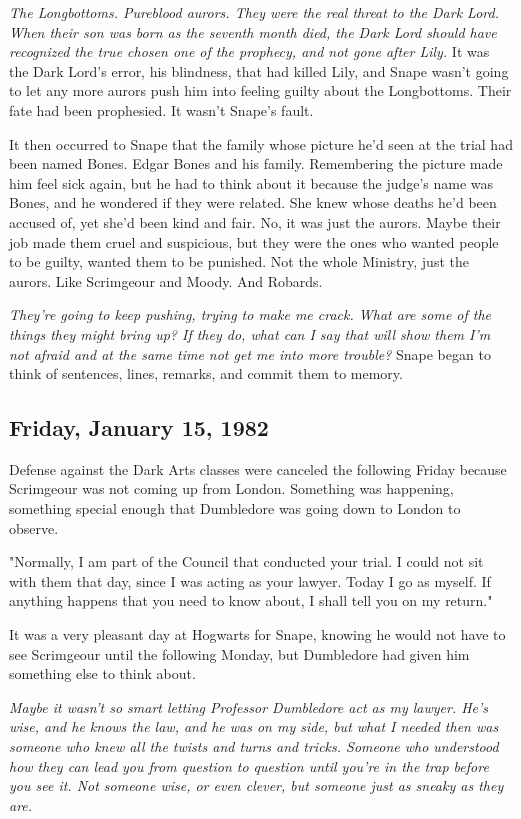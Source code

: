 \emph{The Longbottoms. Pureblood aurors. They were the real threat to the Dark Lord. When their son was born as the seventh month died, the Dark Lord should have recognized the true chosen one of the prophecy, and not gone after Lily.} It was the Dark Lord's error, his blindness, that had killed Lily, and Snape wasn't going to let any more aurors push him into feeling guilty about the Longbottoms. Their fate had been prophesied. It wasn't Snape's fault.

It then occurred to Snape that the family whose picture he'd seen at the trial had been named Bones. Edgar Bones and his family. Remembering the picture made him feel sick again, but he had to think about it because the judge's name was Bones, and he wondered if they were related. She knew whose deaths he'd been accused of, yet she'd been kind and fair. No, it was just the aurors. Maybe their job made them cruel and suspicious, but they were the ones who wanted people to be guilty, wanted them to be punished. Not the whole Ministry, just the aurors. Like Scrimgeour and Moody. And Robards.

\emph{They're going to keep pushing, trying to make me crack. What are some of the things they might bring up? If they do, what can I say that will show them I'm not afraid and at the same time not get me into more trouble?} Snape began to think of sentences, lines, remarks, and commit them to memory.

\subsection{Friday, January 15, 1982}

Defense against the Dark Arts classes were canceled the following Friday because Scrimgeour was not coming up from London. Something was happening, something special enough that Dumbledore was going down to London to observe.

"Normally, I am part of the Council that conducted your trial. I could not sit with them that day, since I was acting as your lawyer. Today I go as myself. If anything happens that you need to know about, I shall tell you on my return."

It was a very pleasant day at Hogwarts for Snape, knowing he would not have to see Scrimgeour until the following Monday, but Dumbledore had given him something else to think about.

\emph{Maybe it wasn't so smart letting Professor Dumbledore act as my lawyer. He's wise, and he knows the law, and he was on my side, but what I needed then was someone who knew all the twists and turns and tricks. Someone who understood how they can lead you from question to question until you're in the trap before you see it. Not someone wise, or even clever, but someone just as sneaky as they are.}

